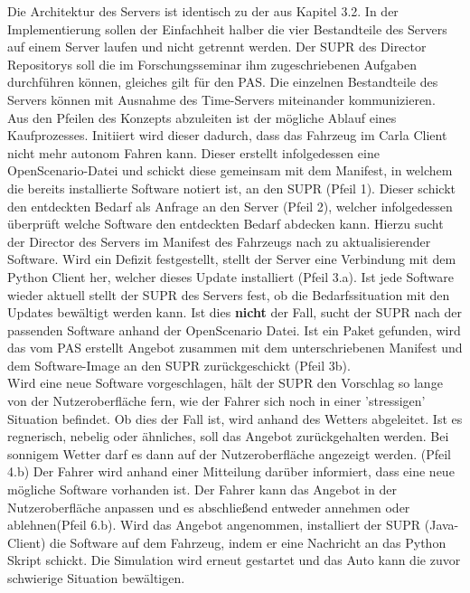 Die Architektur des Servers ist identisch zu der aus Kapitel 3.2. In der Implementierung sollen der Einfachheit halber die vier Bestandteile des Servers auf einem Server laufen und nicht getrennt werden. Der SUPR des Director Repositorys soll die im Forschungsseminar ihm zugeschriebenen Aufgaben durchführen können, gleiches gilt für den PAS. Die einzelnen Bestandteile des Servers können mit Ausnahme des Time-Servers miteinander kommunizieren.\\
Aus den Pfeilen des Konzepts abzuleiten ist der mögliche Ablauf eines Kaufprozesses. Initiiert wird dieser dadurch, dass das Fahrzeug im Carla Client nicht mehr autonom Fahren kann. Dieser erstellt infolgedessen eine OpenScenario-Datei und schickt diese gemeinsam mit dem Manifest, in welchem die bereits installierte Software notiert ist, an den SUPR (Pfeil 1). Dieser schickt den entdeckten Bedarf als Anfrage an den Server (Pfeil 2), welcher infolgedessen überprüft welche Software den entdeckten Bedarf abdecken kann. Hierzu sucht der Director des Servers im Manifest des Fahrzeugs nach zu aktualisierender Software. Wird ein Defizit festgestellt, stellt der Server eine Verbindung mit dem Python Client her, welcher dieses Update installiert (Pfeil 3.a). Ist jede Software wieder aktuell stellt der SUPR des Servers fest, ob die Bedarfssituation mit den Updates bewältigt werden kann. Ist dies \textbf{nicht} der Fall, sucht der SUPR nach der passenden Software anhand der OpenScenario Datei. Ist ein Paket gefunden, wird das vom PAS erstellt Angebot zusammen mit dem unterschriebenen Manifest und dem Software-Image an den SUPR zurückgeschickt (Pfeil 3b).\\

Wird eine neue Software vorgeschlagen, hält der SUPR den Vorschlag so lange von der Nutzeroberfläche fern, wie der Fahrer sich noch in einer 'stressigen' Situation befindet. Ob dies der Fall ist, wird anhand des Wetters abgeleitet. Ist es regnerisch, nebelig oder ähnliches, soll das Angebot zurückgehalten werden. Bei sonnigem Wetter darf es dann auf der Nutzeroberfläche angezeigt werden. (Pfeil 4.b) Der Fahrer wird anhand einer Mitteilung darüber informiert, dass eine neue mögliche Software vorhanden ist. Der Fahrer kann das Angebot in der Nutzeroberfläche anpassen und es abschließend entweder annehmen oder ablehnen(Pfeil 6.b). Wird das Angebot angenommen, installiert der SUPR (Java-Client) die Software auf dem Fahrzeug, indem er eine Nachricht an das Python Skript schickt. Die Simulation wird erneut gestartet und das Auto kann die zuvor schwierige Situation bewältigen.\\